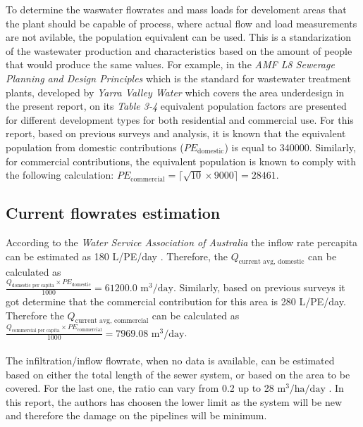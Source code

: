 \documentclass[12pt]{article}
\begin{document}
To determine the waswater flowrates and mass loads for develoment areas that the plant should be capable of process, 
where actual flow and load
measurements are not avilable, the population equivalent can be used. This is a standarization of the wastewater production
and characteristics based on the amount of people that would produce the same values. For example, in the
\textit{AMF L8 Sewerage Planning and Design Principles}
 which is the standard for wastewater treatment plants, developed by 
 \textit{Yarra Valley Water}
  which covers the area underdesign in the present report, on its 
\textit{Table 3-4}
 equivalent population factors are presented for different development types for both residential and commercial use. 
For this report, based on previous surveys and analysis, it is known that the equivalent population from 
domestic contributions (\(PE_{\mathrm{domestic}}\)) is equal to 340000.
Similarly, for commercial contributions, the equivalent population is known to comply with the 
following calculation: 
\(PE_{\mathrm{commercial}}
= \bigl\lceil \sqrt{\text{10}}\times 9000 \bigr\rceil
=  \text{28461} \).

\subsection{Current flowrates estimation}
\label{sec:current_flowrates}

According to the \textit{Water Service Association of Australia} the inflow rate percapita
can be estimated as 
180
L/PE/day \cite{yarravalleywater_2023_amf}. Therefore, the 
\( Q_{\text{current avg, domestic}} \) can be calculated as\\
\(\frac{Q_{\text{domestic per capita}} \times PE_{\text{domestic}}}{1000}= 61200.0\)
\(\mathrm{m^3/day}\).
Similarly, based on previous surveys it got determine that the commercial contribution for this area is
280 L/PE/day. Therefore the 
\( Q_{\text{current avg, commercial}} \) can be calculated as
\(\frac{Q_{\text{commercial per capita}} \times PE_{\text{commercial}}}{1000}= 7969.08\)
\(\mathrm{m^3/day}\).\\
\\
The infiltration/inflow flowrate, when no data is available, can be estimated based on either the
total length of the sewer system, or based on the area to be covered. For the last one, the ratio can vary
from 0.2 up to 28 \(\mathrm{m^3/ha/day}\) \cite{metcalf_2014_wastewater}. In this report, the authors
has choosen the lower limit as the system will be new and therefore the damage on the pipelines will be
minimum. 
\end{document}
